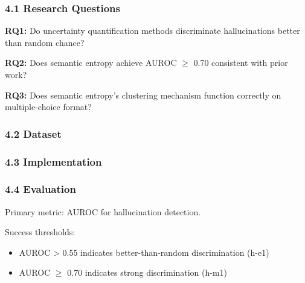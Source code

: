 
\subsubsection{4.1 Research Questions}

\textbf{RQ1:} Do uncertainty quantification methods discriminate hallucinations better than random chance?

\textbf{RQ2:} Does semantic entropy achieve AUROC $\geq$ 0.70 consistent with prior work?

\textbf{RQ3:} Does semantic entropy's clustering mechanism function correctly on multiple-choice format?

\subsubsection{4.2 Dataset}

\begin{table}[htbp]
\centering
{}
\end{table}

\subsubsection{4.3 Implementation}

\begin{table}[htbp]
\centering
{}
\end{table}

\subsubsection{4.4 Evaluation}

Primary metric: AUROC for hallucination detection.

Success thresholds:
\begin{itemize}
\item AUROC > 0.55 indicates better-than-random discrimination (h-e1)
\item AUROC $\geq$ 0.70 indicates strong discrimination (h-m1)
\end{itemize}

